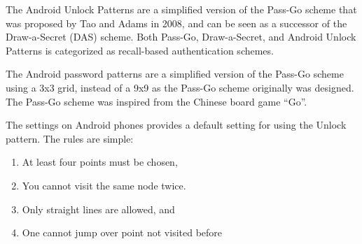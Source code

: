       The Android Unlock Patterns are a simplified version of the Pass-Go scheme that was proposed by Tao and Adams in 2008, and can be seen as a successor of the Draw-a-Secret (DAS) scheme. Both Pass-Go, Draw-a-Secret, and Android Unlock Patterns is categorized as recall-based authentication schemes.

      The Android password patterns are a simplified version of the Pass-Go scheme using a 3x3 grid, instead of a 9x9 as the Pass-Go scheme originally was designed. The Pass-Go scheme was inspired from the Chinese board game ``Go''.

      The settings on Android phones provides a default setting for using the Unlock pattern. 
      The rules are simple: 
          \begin{enumerate}
              \item At least four points must be chosen,
              \item You cannot visit the same node twice.
              \item Only straight lines are allowed, and
              \item One cannot jump over point not visited before
          \end{enumerate}







